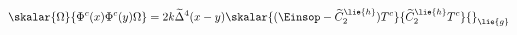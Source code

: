 \begin{equation}
  \label{eq:covfietwo}
  \skalar{\Omega}{\Phi^c(x)\Phi^c(y)\Omega} = 2 k
  \widetilde{\Delta}^4 (x-y) \skalar{(\Einsop - \widetilde{C}_2^\lie{h})
  T^c}{\widetilde{C}_2^\lie{h} T^c}{}_\lie{g}
\end{equation}

